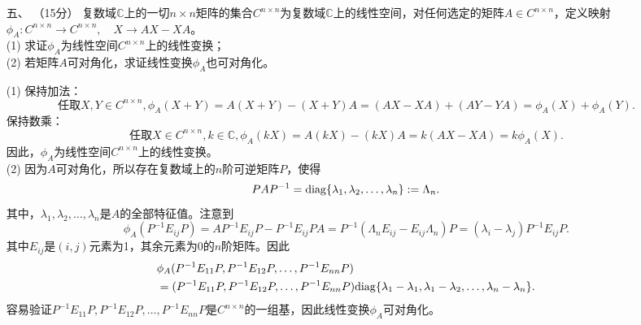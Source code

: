 \begin{enumerate}[1~]
\item[五、]（15分）
复数域$\mathbb{C}$上的一切$n\times n$矩阵的集合$C^{n\times n}$为复数域$\mathbb{C}$上的线性空间，对任何选定的矩阵$A\in C^{n\times n}$，定义映射$\phi _ { A } : C ^ { n \times n } \rightarrow C ^ { n \times n } , \quad X \rightarrow A X - X A$。\\
(1) 求证$\phi_A$为线性空间$C^{n\times n}$上的线性变换；\\
(2) 若矩阵$A$可对角化，求证线性变换$\phi_A$也可对角化。
\begin{solution}
(1) 保持加法：\[
\text{任取}X, Y\in C^{n\times n}, \phi_A(X+Y)=A(X+Y)-(X+Y)A=(AX-XA)+(AY-YA)=\phi_A(X)+\phi_A(Y).
\]
保持数乘：\[
\text{任取}X\in C^{n\times n}, k\in \mathbb{C}, \phi_A(kX)=A(kX)-(kX)A=k(AX-XA)=k\phi_A(X).\]
因此，$\phi_A$为线性空间$C^{n\times n}$上的线性变换。\\
(2) 因为$A$可对角化，所以存在复数域上的$n$阶可逆矩阵$P$，使得\[
PAP^{-1}={\rm diag}\{\lambda_1, \lambda_2, \dots, \lambda_n\}:=\Lambda_n.
\]
其中，$\lambda_1, \lambda_2, \dots, \lambda_n$是$A$的全部特征值。注意到\[
\phi_A(P^{-1}E_{ij}P)=AP^{-1}E_{ij}P-P^{-1}E_{ij}PA=P^{-1}(\Lambda_n E_{ij}-E_{ij}\Lambda_n)P=(\lambda_i-\lambda_j)P^{-1}E_{ij}P.
\]
其中$E_{ij}$是$(i, j)$元素为1，其余元素为0的$n$阶矩阵。因此
\begin{align*}
&\phi_A(P^{-1}E_{11}P, P^{-1}E_{12}P, \dots, P^{-1}E_{nn}P)\\
&=(P^{-1}E_{11}P, P^{-1}E_{12}P, \dots, P^{-1}E_{nn}P){\rm diag}\{\lambda_1-\lambda_1, \lambda_1-\lambda_2, \dots, \lambda_n-\lambda_n\}.
\end{align*}
容易验证$P^{-1}E_{11}P, P^{-1}E_{12}P, \dots, P^{-1}E_{nn}P$是$C^{n\times n}$的一组基，因此线性变换$\phi_A$可对角化。

\end{solution}



\end{enumerate}
